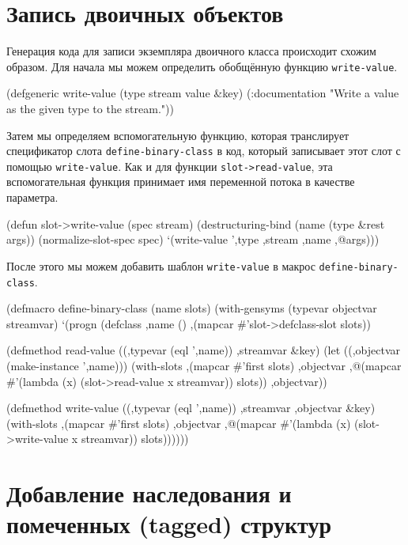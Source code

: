 \section{Запись двоичных объектов}

Генерация кода для записи экземпляра двоичного класса происходит схожим образом. Для
начала мы можем определить обобщённую функцию \lstinline{write-value}.

\begin{myverb}
(defgeneric write-value (type stream value &key)
  (:documentation "Write a value as the given type to the stream."))
\end{myverb}

Затем мы определяем вспомогательную функцию, которая транслирует спецификатор слота
\lstinline{define-binary-class} в код, который записывает этот слот с помощью
\lstinline{write-value}. Как и для функции \lstinline{slot->read-value}, эта вспомогательная функция
принимает имя переменной потока в качестве параметра.

\begin{myverb}
(defun slot->write-value (spec stream)
  (destructuring-bind (name (type &rest args)) (normalize-slot-spec spec)
    `(write-value ',type ,stream ,name ,@args)))
\end{myverb}

После этого мы можем добавить шаблон \lstinline{write-value} в макрос
\lstinline{define-binary-class}.

\begin{myverb}
(defmacro define-binary-class (name slots)
  (with-gensyms (typevar objectvar streamvar)
    `(progn
       (defclass ,name ()
         ,(mapcar #'slot->defclass-slot slots))

       (defmethod read-value ((,typevar (eql ',name)) ,streamvar &key)
         (let ((,objectvar (make-instance ',name)))
           (with-slots ,(mapcar #'first slots) ,objectvar
             ,@(mapcar #'(lambda (x) (slot->read-value x streamvar)) slots))
           ,objectvar))

       (defmethod write-value ((,typevar (eql ',name)) ,streamvar ,objectvar &key)
         (with-slots ,(mapcar #'first slots) ,objectvar
           ,@(mapcar #'(lambda (x) (slot->write-value x streamvar)) slots))))))
\end{myverb}

\section{Добавление наследования и помеченных (tagged) структур}

